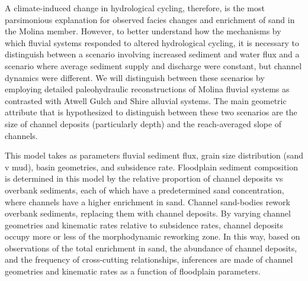 \documentclass[draft]{compact_proposal}\usepackage[]{graphicx}\usepackage[]{color}
\begin{document}

A climate-induced change in hydrological cycling, therefore, is the most parsimonious explanation for observed facies changes and enrichment of sand in the Molina member.
However, to better understand how the mechanisms by which fluvial systems responded to altered hydrological cycling, it is necessary to distinguish between a scenario involving increased sediment and water flux and a scenario where average sediment supply and discharge were constant, but channel dynamics were different.
We will distinguish between these scenarios by employing detailed paleohydraulic reconstructions of Molina fluvial systems as contrasted with Atwell Gulch and Shire alluvial systems.
The main geometric attribute that is hypothesized to distinguish between these two scenarios are the size of channel deposits (particularly depth) and the reach-averaged slope of channels.



This model takes as parameters fluvial sediment flux, grain size distribution (sand v mud), basin geometries, and subsidence rate.
Floodplain sediment composition is determined in this model by the relative proportion of channel deposits vs overbank sediments, each of which have a predetermined sand concentration, where channels have a higher enrichment in sand.
Channel sand-bodies rework overbank sediments, replacing them with channel deposits.
By varying channel geometries and kinematic rates relative to subsidence rates, channel deposits occupy more or less of the morphodynamic reworking zone.
In this way, based on observations of the total enrichment in sand, the abundance of channel deposits, and the frequency of cross-cutting relationships, inferences are made of channel geometries and kinematic rates as a function of floodplain parameters.




\printbibliography
\end{document}

